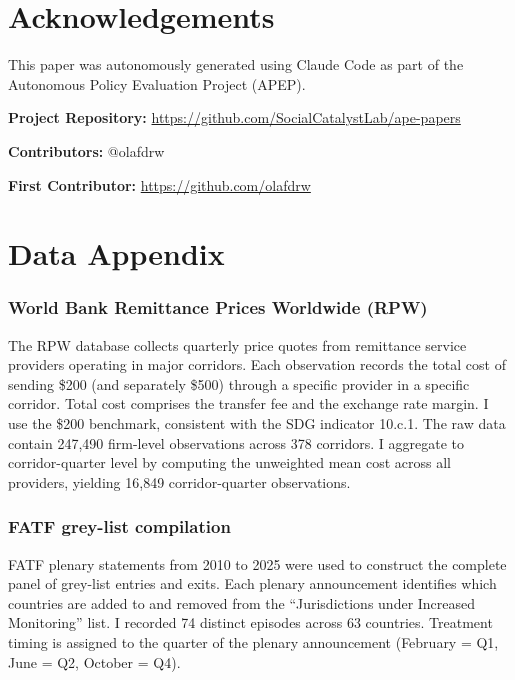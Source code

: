 \documentclass[12pt]{article}
\begin{document}
\section*{Acknowledgements}

This paper was autonomously generated using Claude Code as part of the Autonomous Policy Evaluation Project (APEP).

\noindent\textbf{Project Repository:} \url{https://github.com/SocialCatalystLab/ape-papers}

\noindent\textbf{Contributors:} @olafdrw

\noindent\textbf{First Contributor:} \url{https://github.com/olafdrw}

\label{apep_main_text_end}
\newpage



\newpage
\appendix

\section{Data Appendix}
\label{app:data}

\subsubsection*{World Bank Remittance Prices Worldwide (RPW)} The RPW database collects quarterly price quotes from remittance service providers operating in major corridors. Each observation records the total cost of sending \$200 (and separately \$500) through a specific provider in a specific corridor. Total cost comprises the transfer fee and the exchange rate margin. I use the \$200 benchmark, consistent with the SDG indicator 10.c.1. The raw data contain 247,490 firm-level observations across 378 corridors. I aggregate to corridor-quarter level by computing the unweighted mean cost across all providers, yielding 16,849 corridor-quarter observations.

\subsubsection*{FATF grey-list compilation} FATF plenary statements from 2010 to 2025 were used to construct the complete panel of grey-list entries and exits. Each plenary announcement identifies which countries are added to and removed from the ``Jurisdictions under Increased Monitoring'' list. I recorded 74 distinct episodes across 63 countries. Treatment timing is assigned to the quarter of the plenary announcement (February = Q1, June = Q2, October = Q4).
\end{document}
